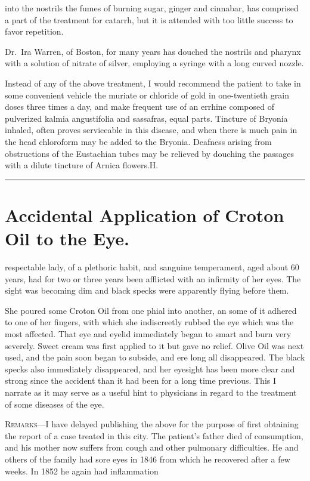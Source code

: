 into the nostrils the fumes of burning sugar, ginger and cinnabar,
has comprised a part of the treatment for catarrh, but it is attended
with too little success to favor repetition.

Dr.\ Ira Warren, of Boston, for many years has douched the nostrils
and pharynx with a solution of nitrate of silver, employing a syringe
with a long curved nozzle.

Instead of any of the above treatment, I would recommend the patient
to take in some convenient vehicle the muriate or chloride of gold
in one-twentieth grain doses three times a day, and make frequent use
of an errhine composed of pulverized kalmia angustifolia and sassafras,
equal parts. Tincture of Bryonia inhaled, often proves serviceable in
this disease, and when there is much pain in the head chloroform may
be added to the Bryonia. Deafness arising from obstructions of the
Eustachian tubes may be relieved by douching the passages with a dilute
tincture of Arnica flowers.\hfill{}H.{}

\fancybreak{* * *}

\section{Accidental Application of Croton Oil to the Eye.}


 respectable lady, of a plethoric habit, and sanguine temperament,
aged about 60 years, had for two or three years been afflicted
with an infirmity of her eyes. The sight was becoming dim and black
specks were apparently flying before them.

She poured some Croton Oil from one phial into another, an some
of it adhered to one of her fingers, with which she indiscreetly rubbed
the eye which was the most affected. That eye and eyelid immediately
began to smart and burn very severely. Sweet cream was first applied
to it but gave no relief. Olive Oil was next used, and the pain soon began
to subside, and ere long all disappeared. The black specks also immediately
disappeared, and her eyesight has been more clear and strong
since the accident than it had been for a long time previous. This I narrate
as it may serve as a useful hint to physicians in regard to the treatment
of some diseases of the eye.

\textsc{Remarks}---I have delayed publishing the above for the purpose of first
obtaining the report of a case treated in this city. The patient's father
died of consumption, and his mother now suffers from cough and other
pulmonary difficulties. He and others of the family had sore eyes in 1846
from which he recovered after a few weeks. In 1852 he again had inflammation\endinput
